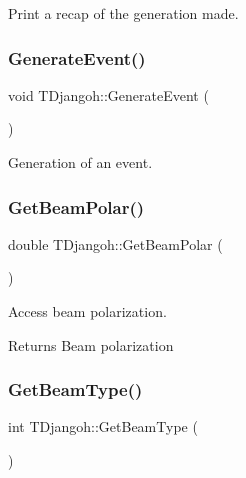 Print a recap of the generation made. 

\mbox{\label{class_t_djangoh_a121effe35c3f3ac168a4663bcd5eef5c}} 
\subsubsection{\texorpdfstring{Generate\+Event()}{GenerateEvent()}}
{\footnotesize\ttfamily void T\+Djangoh\+::\+Generate\+Event (\begin{DoxyParamCaption}{ }\end{DoxyParamCaption})}



Generation of an event. 

\mbox{\label{class_t_djangoh_a62b52fce9e36c0c7296fc1e519b1b902}} 
\subsubsection{\texorpdfstring{Get\+Beam\+Polar()}{GetBeamPolar()}}
{\footnotesize\ttfamily double T\+Djangoh\+::\+Get\+Beam\+Polar (\begin{DoxyParamCaption}{ }\end{DoxyParamCaption})}



Access beam polarization. 

\begin{DoxyReturn}{Returns}
Beam polarization 
\end{DoxyReturn}
\mbox{\label{class_t_djangoh_a2ed9a38fa1593d5a6a6e2c33b2912d1b}} 
\subsubsection{\texorpdfstring{Get\+Beam\+Type()}{GetBeamType()}}
{\footnotesize\ttfamily int T\+Djangoh\+::\+Get\+Beam\+Type (\begin{DoxyParamCaption}{ }\end{DoxyParamCaption})}



